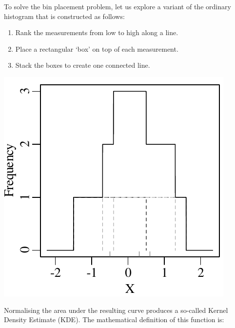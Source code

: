 To solve the bin placement problem, let us explore a variant of the
ordinary histogram that is constructed as follows:
\begin{enumerate}
\item Rank the measurements from low to high along a line.
\item Place a rectangular `box' on top of each measurement.
\item Stack the boxes to create one connected line.
\end{enumerate}
\noindent\begin{minipage}[t][][b]{.3\textwidth}
  \includegraphics[width=\textwidth]{../figures/rectKDE.pdf}\medskip
\end{minipage}
\begin{minipage}[t][][t]{.7\textwidth}
  \label{fig:rectangles}
\end{minipage}

Normalising the area under the resulting curve produces a so-called
Kernel Density Estimate (KDE). The mathematical definition of this
function is:

